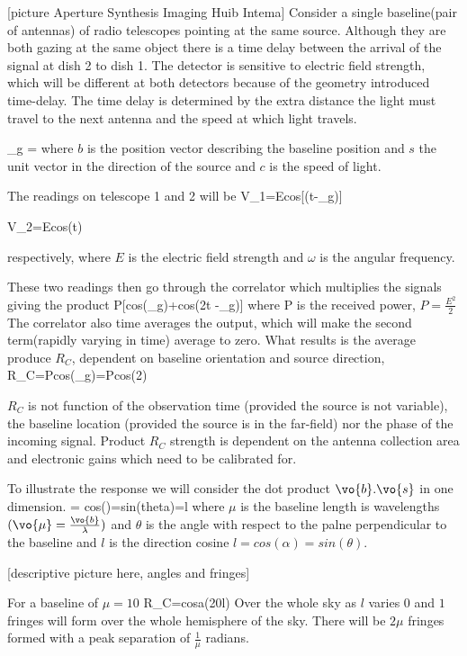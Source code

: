 [picture Aperture Synthesis Imaging Huib Intema]
Consider a single baseline(pair of antennas) of radio telescopes pointing at the same source.
Although they are both gazing at the same object there is a time delay between the arrival of the signal at dish 2 to dish 1.
The detector is sensitive to electric field strength, which will be different at both detectors because of the geometry introduced time-delay.
The time delay is determined by the extra distance the light must travel to the next antenna and the speed at which light travels.

\be
\tau_g = 
\ee
where $b$ is the position vector describing the baseline position and $s$ the unit vector in the direction of the source and $c$ is the speed of light.

The readings on telescope 1 and 2 will be
\be
V_1=Ecos[\omega(t-\tau_g)]
\ee

\be
V_2=Ecos(\omega t)
\ee

respectively, where $E$ is the electric field strength and $\omega$ is the angular frequency.

These two readings then go through the correlator which multiplies the signals giving the product
\be
P[cos(\omega \tau_g)+cos(2\omega t -\omega \tau_g)]
\ee
where P is the received power, $P=\frac{E^2}{2}$
The correlator also time averages the output, which will make the second term(rapidly varying in time) average to zero.
What results is the average produce $R_C$, dependent on baseline orientation and source direction,
\be
R_C=Pcos(\omega \tau_g)=Pcos(2\pi {})
\ee

$R_C$ is not function of the observation time (provided the source is not variable), the baseline location (provided the source is in the far-field) nor the phase of the incoming signal.
Product $R_C$ strength is dependent on the antenna collection area and electronic gains which need to be calibrated for.

To illustrate the response we will consider the dot product $\vo{b}.\vo{s}$ in one dimension.
\be
 = \mu cos(\alpha)=\mu sin(theta)=\mu l
\ee
where $\mu$ is the baseline length is wavelengths $(\vo{\mu}=\frac{\vo{b}}{\lambda})$ and $\theta$ is the angle with respect to the palne perpendicular to the baseline and $l$ is the direction cosine $l=cos(\alpha)=sin(\theta).$

[descriptive picture here, angles and fringes]

For a baseline of $\mu=10$ 
\be
R_C=cosa(20\pi l)
\ee
Over the whole sky as $l$ varies $0$ and $1$ fringes will form over the whole hemisphere of the sky.
There will be $2\mu$ fringes formed with a peak separation of $\frac{1}{\mu}$ radians.

